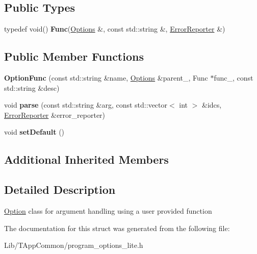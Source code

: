 \subsection*{Public Types}
\begin{DoxyCompactItemize}
\item 
\mbox{\label{structdf_1_1program__options__lite_1_1_option_func_af23fd41d068f521d302095bb068ff66d}} 
typedef void() {\bfseries Func}(\hyperlink{structdf_1_1program__options__lite_1_1_options}{Options} \&, const std\+::string \&, \hyperlink{structdf_1_1program__options__lite_1_1_error_reporter}{Error\+Reporter} \&)
\end{DoxyCompactItemize}
\subsection*{Public Member Functions}
\begin{DoxyCompactItemize}
\item 
\mbox{\label{structdf_1_1program__options__lite_1_1_option_func_afc975804044168ce285b9ae25a4248e7}} 
{\bfseries Option\+Func} (const std\+::string \&name, \hyperlink{structdf_1_1program__options__lite_1_1_options}{Options} \&parent\+\_\+, Func $\ast$func\+\_\+, const std\+::string \&desc)
\item 
\mbox{\label{structdf_1_1program__options__lite_1_1_option_func_af412834e436aed1c7df48a7d38e84513}} 
void {\bfseries parse} (const std\+::string \&arg, const std\+::vector$<$ int $>$ \&idcs, \hyperlink{structdf_1_1program__options__lite_1_1_error_reporter}{Error\+Reporter} \&error\+\_\+reporter)
\item 
\mbox{\label{structdf_1_1program__options__lite_1_1_option_func_ab8e6b6828a1fbda1c1d15d5b80d55e89}} 
void {\bfseries set\+Default} ()
\end{DoxyCompactItemize}
\subsection*{Additional Inherited Members}


\subsection{Detailed Description}
\hyperlink{structdf_1_1program__options__lite_1_1_option}{Option} class for argument handling using a user provided function 

The documentation for this struct was generated from the following file\+:\begin{DoxyCompactItemize}
\item 
Lib/\+T\+App\+Common/program\+\_\+options\+\_\+lite.\+h\end{DoxyCompactItemize}
